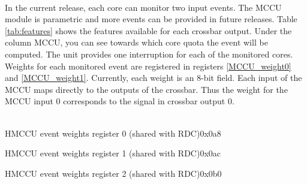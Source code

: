 \\
In the current release, each core can monitor two input events. The MCCU module is parametric and more events can be provided in future releases.  Table \ref{tab:features} shows the features available for each crossbar output. Under the column MCCU, you can see towards which core quota the event will be computed.
The unit provides one interruption for each of the monitored cores. 
\\
Weights for each monitored event are registered in registers \ref{MCCU_weight0} and \ref{MCCU_weight1}. Currently, each weight is an 8-bit field. Each input of the MCCU maps directly to the outputs of the crossbar. Thus the weight for the MCCU input 0 corresponds to the signal in crossbar output 0.\\
\\
\begin{register}{H}{MCCU event weights register 0 (shared with RDC)}{0x0a8}
	\label{MCCU_weight0}
	\regnewline
\end{register}
\begin{register}{H}{MCCU event weights register 1 (shared with RDC)}{0x0ac}
	\label{MCCU_weight1}
	\regnewline
\end{register}
\begin{register}{H}{MCCU event weights register 2 (shared with RDC)}{0x0b0}
	\label{MCCU_weight1}
	\regnewline
\end{register}

